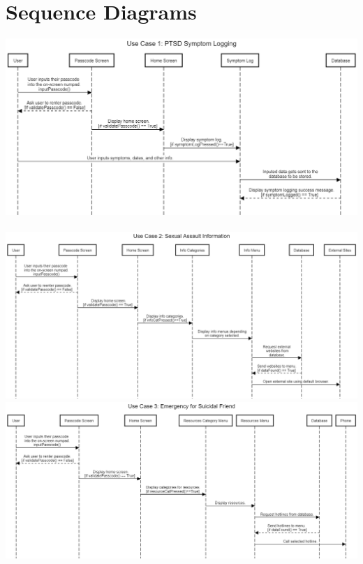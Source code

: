 \documentclass[letterpaper,12pt,titlepage]{article}
\begin{document}
\section{Sequence Diagrams}
\vspace{50pt}
\hspace*{-1in}
\includegraphics[scale=.44]{Use_Case_1__PTSD_Symptom_Logging}~\cite{seqdia}
\newpage
\hspace*{-1.2in}
\includegraphics[scale=.38]{Use_Case_2__Sexual_Assault_Information}
\newpage
\hspace*{-1.2in}
\includegraphics[scale=.36]{Use_Case_3__Emergency_for_Suicidal_Friend}
\vspace{0pt}
\end{document}
